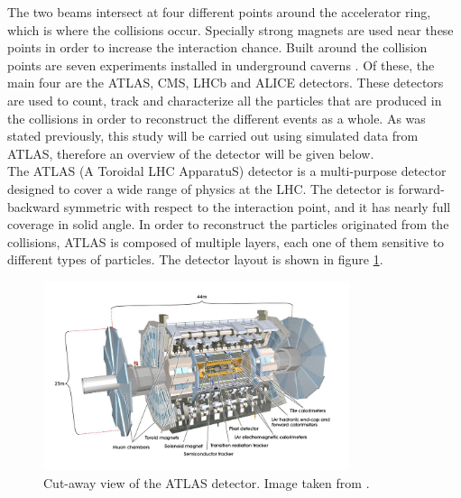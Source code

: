 \documentclass[main]{subfiles} %
\begin{document}
The two beams intersect at four different points around the accelerator ring, which is where the collisions occur. Specially strong magnets are used near these points in order to increase the interaction chance. Built around the collision points are seven experiments installed in underground caverns \cite{Lopes2022}. Of these, the main four are the ATLAS, CMS, LHCb and ALICE detectors. These detectors are used to count, track and characterize all the particles that are produced in the collisions in order to reconstruct the different events as a whole. As was stated previously, this study will be carried out using simulated data from ATLAS, therefore an overview of the detector will be given below.\\

The ATLAS (A Toroidal LHC ApparatuS) detector \cite{Aad2008} is a multi-purpose detector designed to cover a wide range of physics at the LHC. The detector is forward-backward symmetric with respect to the interaction point, and it has nearly full coverage in solid angle. In order to reconstruct the particles originated from the collisions, ATLAS is composed of multiple layers, each one of them sensitive to different types of particles. The detector layout is shown in figure \ref{fig:ATLAS_detector}.\\

\begin{figure}[h]
    \centering
    \includegraphics[width=0.8\textwidth]{../Figures/Theory/ATLAS_detector.png}
    \caption{Cut-away view of the ATLAS detector. Image taken from \cite{Aad2008}.}
    \label{fig:ATLAS_detector}
\end{figure}
\end{document}
